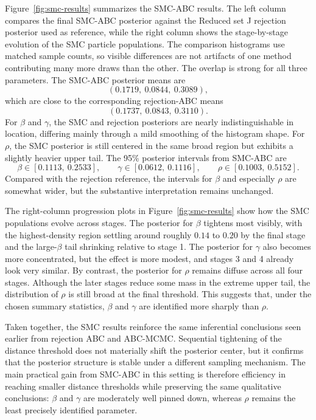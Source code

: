 \documentclass[11pt]{article}
\begin{document}
Figure~\ref{fig:smc-results} summarizes the SMC-ABC results. The left column compares the final SMC-ABC posterior against the Reduced set J rejection posterior used as reference, while the right column shows the stage-by-stage evolution of the SMC particle populations. The comparison histograms use matched sample counts, so visible differences are not artifacts of one method contributing many more draws than the other. The overlap is strong for all three parameters. The SMC-ABC posterior means are
\[
(0.1719,\ 0.0844,\ 0.3089),
\]
which are close to the corresponding rejection-ABC means
\[
(0.1737,\ 0.0843,\ 0.3110).
\]
For $\beta$ and $\gamma$, the SMC and rejection posteriors are nearly indistinguishable in location, differing mainly through a mild smoothing of the histogram shape. For $\rho$, the SMC posterior is still centered in the same broad region but exhibits a slightly heavier upper tail. The 95\% posterior intervals from SMC-ABC are
\[
\beta \in [0.1113,\ 0.2533], \qquad
\gamma \in [0.0612,\ 0.1116], \qquad
\rho \in [0.1003,\ 0.5152].
\]
Compared with the rejection reference, the intervals for $\beta$ and especially $\rho$ are somewhat wider, but the substantive interpretation remains unchanged.

The right-column progression plots in Figure~\ref{fig:smc-results} show how the SMC populations evolve across stages. The posterior for $\beta$ tightens most visibly, with the highest-density region settling around roughly $0.14$ to $0.20$ by the final stage and the large-$\beta$ tail shrinking relative to stage 1. The posterior for $\gamma$ also becomes more concentrated, but the effect is more modest, and stages 3 and 4 already look very similar. By contrast, the posterior for $\rho$ remains diffuse across all four stages. Although the later stages reduce some mass in the extreme upper tail, the distribution of $\rho$ is still broad at the final threshold. This suggests that, under the chosen summary statistics, $\beta$ and $\gamma$ are identified more sharply than $\rho$.

Taken together, the SMC results reinforce the same inferential conclusions seen earlier from rejection ABC and ABC-MCMC. Sequential tightening of the distance threshold does not materially shift the posterior center, but it confirms that the posterior structure is stable under a different sampling mechanism. The main practical gain from SMC-ABC in this setting is therefore efficiency in reaching smaller distance thresholds while preserving the same qualitative conclusions: $\beta$ and $\gamma$ are moderately well pinned down, whereas $\rho$ remains the least precisely identified parameter.
\end{document}
